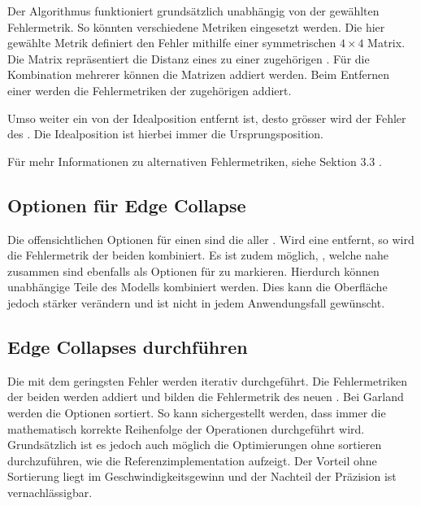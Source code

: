 Der Algorithmus funktioniert grundsätzlich unabhängig von der gewählten Fehlermetrik. So könnten verschiedene Metriken eingesetzt werden.
Die hier gewählte Metrik definiert den Fehler mithilfe einer symmetrischen $4\times 4$ Matrix. Die Matrix repräsentiert die Distanz eines  zu einer zugehörigen . Für die Kombination mehrerer  können die Matrizen addiert werden. Beim Entfernen einer  werden die Fehlermetriken der zugehörigen  addiert.

Umso weiter ein  von der Idealposition entfernt ist, desto grösser wird der Fehler des . Die Idealposition ist hierbei immer die Ursprungsposition.

Für mehr Informationen zu alternativen Fehlermetriken, siehe  Sektion 3.3 \cite{quadridBasedSurfaceSimplification}.

\subsection{Optionen für Edge Collapse}

Die offensichtlichen Optionen für einen  sind die  aller . Wird eine  entfernt, so wird die Fehlermetrik der beiden  kombiniert.
Es ist zudem möglich, , welche nahe zusammen sind ebenfalls als Optionen für  zu markieren. Hierdurch können unabhängige Teile des Modells kombiniert werden. Dies kann die Oberfläche jedoch stärker verändern und ist nicht in jedem Anwendungsfall gewünscht.

\subsection{Edge Collapses durchführen}

Die  mit dem geringsten Fehler werden iterativ durchgeführt. Die Fehlermetriken der beiden  werden addiert und bilden die Fehlermetrik des neuen . Bei Garland werden die Optionen sortiert. So kann sichergestellt werden, dass immer die mathematisch korrekte Reihenfolge der Operationen durchgeführt wird. Grundsätzlich ist es jedoch auch möglich die Optimierungen ohne sortieren durchzuführen, wie die Referenzimplementation aufzeigt. Der Vorteil ohne Sortierung liegt im Geschwindigkeitsgewinn und der Nachteil der Präzision ist vernachlässigbar.


